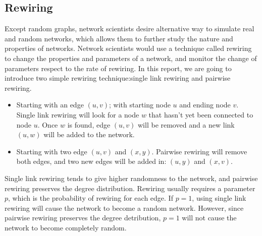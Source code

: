 \documentclass[12pt]{article}
\begin{document}
\subsection{Rewiring}
\label{rewiring}
Except random graphs, network scientists desire alternative way to simulate real and random networks, which allows them to further study the nature and properties of networks. Network scientists would use a technique called rewiring to change the properties and parameters of a network, and monitor the change of parameters respect to the rate of rewiring.\cite{network_rewiring} In this report, we are going to introduce two simple rewiring technique:single link rewiring and pairwise rewiring.\\
\begin{itemize}
    \item Starting with an edge $(u,v)$; with starting node $u$ and ending node $v$. Single link rewiring will look for a node $w$ that hasn't yet been connected to node $u$. Once $w$ is found, edge $(u,v)$ will be removed and a new link $(u,w)$ will be added to the network. 
    \item Starting with two edge $(u,v)$ and $(x,y)$. Pairwise rewiring will remove both edges, and two new edges will be added in: $(u,y)$ and $(x,v)$.
\end{itemize}
\noindent
Single link rewiring tends to give higher randomness to the network, and pairwise rewiring preserves the degree distribution. Rewiring usually requires a parameter $p$, which is the probability of rewiring for each edge. If $p=1$, using single link rewiring will cause the network to become a random network. However, since pairwise rewiring preserves the degree detribution, $p=1$ will not cause the network to become completely random.
\end{document}
